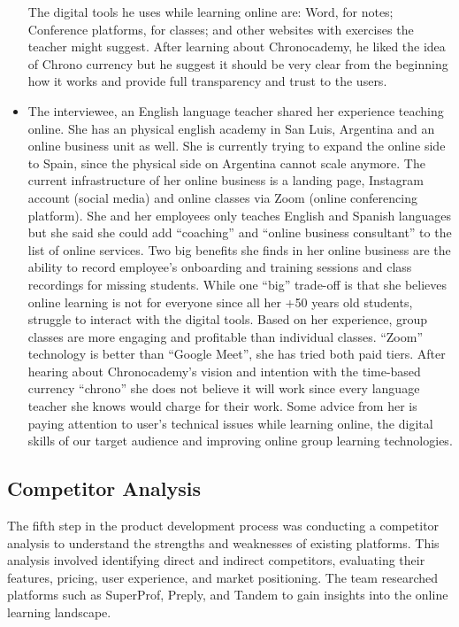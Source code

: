 \begin{itemize}
    The digital tools he uses while learning online are: Word, for notes; Conference platforms, for classes; and other websites with exercises the teacher might suggest.
    After learning about Chronocademy, he liked the idea of Chrono currency but he suggest it should be very clear from the beginning how it works and provide full transparency and trust to the users.
    \item The interviewee, an English language teacher shared her experience teaching online.
    She has an physical english academy in San Luis, Argentina and an online business unit as well.
    She is currently trying to expand the online side to Spain, since the physical side on Argentina cannot scale anymore.
    The current infrastructure of her online business is a landing page, Instagram account (social media) and online classes via Zoom (online conferencing platform).
    She and her employees only teaches English and Spanish languages but she said she could add ``coaching'' and ``online business consultant'' to the list of online services.
    Two big benefits she finds in her online business are the ability to record employee's onboarding and training sessions and class recordings for missing students.
    While one ``big'' trade-off is that she believes online learning is not for everyone since all her +50 years old students, struggle to interact with the digital tools.
    Based on her experience, group classes are more engaging and profitable than individual classes.
    ``Zoom'' technology is better than ``Google Meet'', she has tried both paid tiers.
    After hearing about Chronocademy's vision and intention with the time-based currency ``chrono'' she does not believe it will work since every language teacher she knows would charge for their work.
    Some advice from her is paying attention to user's technical issues while learning online, the digital skills of our target audience and improving online group learning technologies.
\end{itemize}

\subsection{Competitor Analysis}\label{subsec:competitor-analysis}
The fifth step in the product development process was conducting a competitor analysis to understand the strengths and weaknesses of existing platforms.
This analysis involved identifying direct and indirect competitors, evaluating their features, pricing, user experience, and market positioning.
The team researched platforms such as SuperProf, Preply, and Tandem to gain insights into the online learning landscape.

